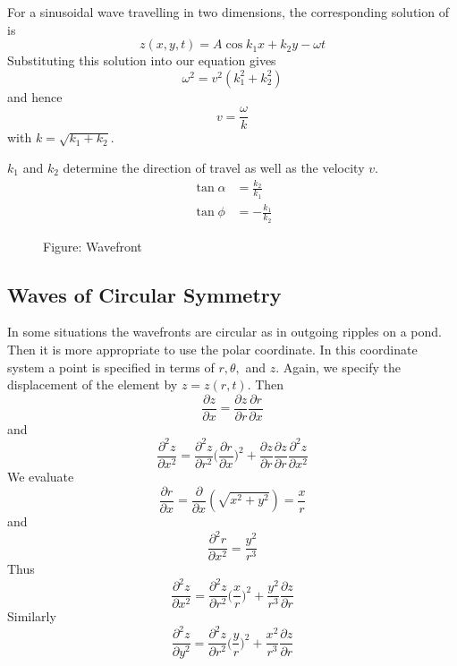 \documentclass[../../../main.tex]{subfiles}
\begin{document}
For a sinusoidal wave travelling in two dimensions, the corresponding solution of is
\begin{equation*}
    z(x,y,t)=A\cos k_1x+k_2y-\omega t
\end{equation*}
Substituting this solution into our equation gives
\begin{equation*}
    \omega^2=v^2(k_1^2+k_2^2)
\end{equation*}
and hence
\begin{equation*}
    v=\frac{\omega}{k}
\end{equation*}
with $k=\sqrt{k_1+k_2}$.

$k_1$ and $k_2$ determine the direction of travel as well as the velocity $v$.
\begin{align*}
    \tan \alpha&=\frac{k_2}{k_1}\\
    \tan\phi&=-\frac{k_1}{k_2}
\end{align*}

\begin{figure}
    \centering
    \caption*{Figure: Wavefront}
\end{figure}

\subsection{Waves of Circular Symmetry}
In some situations the wavefronts are circular as in outgoing ripples on a pond. Then it is more appropriate to use the polar coordinate. In this coordinate system a point is speciﬁed in terms of $r, \theta,$ and $z$. Again, we specify the displacement of the element by $z=z(r,t)$. Then
\begin{equation*}
    \frac{\partial z}{\partial x}=\frac{\partial z}{\partial r}\frac{\partial r}{\partial x}
\end{equation*}
and
\begin{equation*}
    \frac{\partial^2 z}{\partial x^2}=\frac{\partial^2 z}{\partial r^2}\biggl(\frac{\partial r}{\partial x}\biggr)^2+ \frac{\partial z}{\partial r}\frac{\partial z}{\partial r}\frac{\partial^2 z}{\partial x^2}
\end{equation*}
We evaluate
\begin{equation*}
    \frac{\partial r}{\partial x}=\frac{\partial }{\partial x}(\sqrt{x^2+y^2}) = \frac{x}{r}
\end{equation*}
and
\begin{equation*}
    \frac{\partial^2 r}{\partial x^2}= \frac{y^2}{r^3}
\end{equation*}
Thus
\begin{equation*}
    \frac{\partial^2 z}{\partial x^2}= \frac{\partial^2 z}{\partial r^2}\biggl(\frac{x}{r}\biggr)^2 + \frac{y^2}{r^3}\frac{\partial z}{\partial r}
\end{equation*}
Similarly
\begin{equation*}
    \frac{\partial^2 z}{\partial y^2}= \frac{\partial^2 z}{\partial r^2}\biggl(\frac{y}{r}\biggr)^2 + \frac{x^2}{r^3}\frac{\partial z}{\partial r}
\end{equation*}
\end{document}
